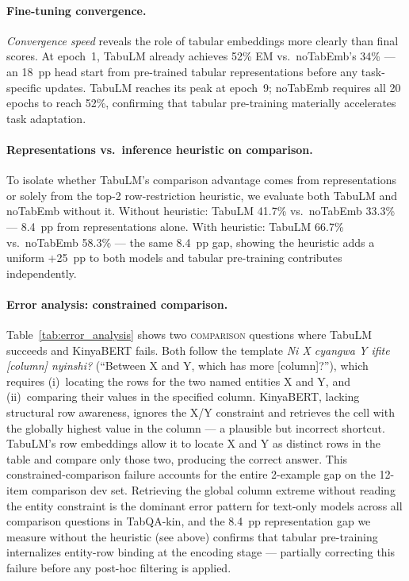 \documentclass[11pt]{article}
\begin{document}
\paragraph{Fine-tuning convergence.}
\emph{Convergence speed} reveals the role of tabular embeddings more clearly than final scores.
At epoch~1, TabuLM already achieves 52\% EM vs.\ noTabEmb's 34\% --- an 18~pp head start from pre-trained tabular representations before any task-specific updates.
TabuLM reaches its peak at epoch~9; noTabEmb requires all 20 epochs to reach 52\%, confirming that tabular pre-training materially accelerates task adaptation.

\paragraph{Representations vs.\ inference heuristic on comparison.}
To isolate whether TabuLM's comparison advantage comes from representations or solely from the top-2 row-restriction heuristic, we evaluate both TabuLM and noTabEmb without it.
Without heuristic: TabuLM 41.7\% vs.\ noTabEmb 33.3\% --- 8.4~pp from representations alone.
With heuristic: TabuLM 66.7\% vs.\ noTabEmb 58.3\% --- the same 8.4~pp gap, showing the heuristic adds a uniform +25~pp to both models and tabular pre-training contributes independently.

\paragraph{Error analysis: constrained comparison.}
\label{sec:analysis_error}
Table~\ref{tab:error_analysis} shows two \textsc{comparison} questions where TabuLM succeeds and KinyaBERT fails.
Both follow the template \textit{Ni X cyangwa Y ifite [column] nyinshi?} (``Between X and Y, which has more [column]?''), which requires (i)~locating the rows for the two named entities X and Y, and (ii)~comparing their values in the specified column.
KinyaBERT, lacking structural row awareness, ignores the X/Y constraint and retrieves the cell with the globally highest value in the column --- a plausible but incorrect shortcut.
TabuLM's row embeddings allow it to locate X and Y as distinct rows in the table and compare only those two, producing the correct answer.
This constrained-comparison failure accounts for the entire 2-example gap on the 12-item comparison dev set.
Retrieving the global column extreme without reading the entity constraint is the dominant error pattern for text-only models across all comparison questions in TabQA-kin, and the 8.4~pp representation gap we measure without the heuristic (see above) confirms that tabular pre-training internalizes entity-row binding at the encoding stage --- partially correcting this failure before any post-hoc filtering is applied.
\end{document}
